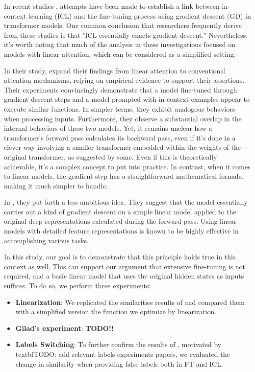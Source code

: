 In recent studies \cite{vaswani2023attention,dai2023gpt}, attempts have been made to establish a link between in-context learning (ICL) and the fine-tuning process using gradient descent (GD) in transformer models. One common conclusion that researchers frequently derive from these studies is that "ICL essentially enacts gradient descent." Nevertheless, it's worth noting that much of the analysis in these investigations focused on models with linear attention, which can be considered as a simplified setting.

In their study, \cite{dai2023gpt} expand their findings from linear attention to conventional attention mechanisms, relying on empirical evidence to support their assertions.
Their experiments convincingly demonstrate that a model fine-tuned through gradient descent steps and a model prompted with in-context examples appear to execute similar functions. In simpler terms, they exhibit analogous behaviors when processing inputs. Furthermore, they observe a substantial overlap in the internal behaviors of these two models.
Yet, it remains unclear how a transformer's forward pass calculates its backward pass, even if it's done in a clever way involving a smaller transformer embedded within the weights of the original transformer, as suggested by some. Even if this is theoretically achievable, it's a complex concept to put into practice. In contrast, when it comes to linear models, the gradient step has a straightforward mathematical formula, making it much simpler to handle.

In \cite{vaswani2023attention}, they put forth a less ambitious idea. They suggest that the model essentially carries out a kind of gradient descent on a simple linear model applied to the original deep representations calculated during the forward pass.
Using linear models with detailed feature representations is known to be highly effective in accomplishing various tasks.


In this study, our goal is to demonstrate that this principle holds true in this context as well. This can support our argument that extensive fine-tuning is not required, and a basic linear model that uses the original hidden states as inputs suffices.
To do so, we perform three experiments:
\begin{itemize}
    \item \textbf{Linearization}: We replicated the similarities results of \cite{dai2023gpt} and compared them with a simplified version the function we optimize by linearization.
    \item \textbf{Gilad's experiment}: \textbf{TODO!!}
    \item \textbf{Labels Switching}: To further confirm the results of \cite{dai2023gpt}, motivated by textbf{TODO: add relevant labels experiments papers}, we evaluated the change in similarity when providing false labels both in FT and ICL.
\end{itemize}